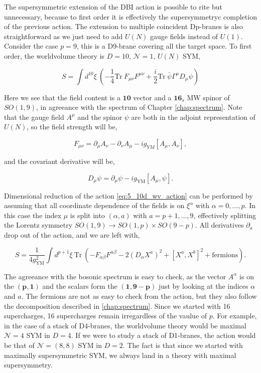 The supersymmetric extension of the DBI action is possible to rite but unnecessary, because to first order it is effectively the supersymmetryc completion of the previous action. The extension to multiple coincident Dp-branes is also straightforward as we just need to add $U(N)$ gauge fields instead of $U(1)$. Consider the case $p=9$, this is a D9-brane covering all the target space. To first order, the worldvolume theory is $D = 10$, $\mathcal{N} = 1$, $U(N)$ SYM,

\begin{equation}
    \label{eq:5_10d_wv_action}
    S=\int d^{10}\xi\mathrm{~}\left(-\frac14\mathrm{Tr~}F_{\mu\nu}F^{\mu\nu}+\frac i2\mathrm{Tr~}\bar{\psi}\Gamma^\mu D_\mu\psi\right)
\end{equation}

Here we see that the field content is a $\mathbf{10}$ vector and a $\mathbf{16}_s$ MW spinor of $SO(1,9)$, in agreeance with the spectrum of Chapter \ref{chap:spectrum}. Note that the gauge field $A^\mu$ and the spinor $\psi$ are both in the adjoint representation of $U(N)$, so the field strength will be,

\begin{equation}
    F_{\mu\nu}=\partial_\mu A_\nu-\partial_\nu A_\mu-ig_{YM}[A_\mu,A_\nu],
\end{equation}

and the covariant derivative will be,

\begin{equation}
    D_\mu\psi=\partial_\mu\psi-ig_{\mathrm{YM}}[A_\mu,\psi].
\end{equation}

Dimensional reduction of the action \ref{eq:5_10d_wv_action} can be performed by assuming that all coordinate dependence of the fields is on $\xi^\alpha$ with $\alpha = 0,\dots,p$. In this case the index $\mu$ is split into $(\alpha, a)$ with $a = p+1, \dots, 9$, effectively splitting the Lorentz symmetry $SO(1,9) \rightarrow SO(1,p) \times SO(9-p)$. All derivatives $\partial_a$ drop out of the action, and we are left with,

\begin{equation}
    S=\frac1{4g_{\mathrm{YM}}^2}\int d^{p+1}\xi\mathrm{~Tr~}(-F_{\alpha\beta}F^{\alpha\beta}-2(D_\alpha X^a)^2+[X^a,X^b]^2+\mathrm{fermions}).
\end{equation}

The agreeance with the bosonic spectrum is easy to check, as the vector $A^\alpha$ is on the $(\mathbf{p}, \mathbf{1})$ and the scalars form the $(\mathbf{1}, \mathbf{9-p})$ just by looking at the indices $\alpha$ and $a$. The fermions are not as easy to check from the action, but they also follow the decomposition described in \ref{chap:spectrum}. Since we started with 16 supercharges, 16 supercharges remain irregardless of the vaulue of $p$. For example, in the case of a stack of D4-branes, the worldvolume theory would be maximal $\mathcal{N} = 4$ SYM in $D = 4$. If we were to study a stack of D1-branes, the action would be that of $\mathcal{N} = (8,8)$ SYM in $D = 2$. The fact is that since we started with maximally supersymmetric SYM, we always land in a theory with maximal supersymmetry.

